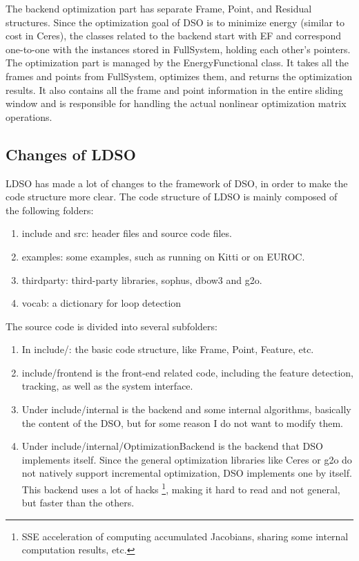 \documentclass[a4paper,10pt]{article}
\begin{document}
	The backend optimization part has separate Frame, Point, and Residual structures. Since the optimization goal of DSO is to minimize energy (similar to cost in Ceres), the classes related to the backend start with EF and correspond one-to-one with the instances stored in FullSystem, holding each other's pointers. The optimization part is managed by the EnergyFunctional class. It takes all the frames and points from FullSystem, optimizes them, and returns the optimization results. It also contains all the frame and point information in the entire sliding window and is responsible for handling the actual nonlinear optimization matrix operations.

	
	\subsection{Changes of LDSO}
	LDSO has made a lot of changes to the framework of DSO, in order to make the code structure more clear. The code structure of LDSO is mainly composed of the following folders:
	\begin{enumerate}
	\item include and src: header files and source code files.
	\item examples: some examples, such as running on Kitti or on EUROC.
	\item thirdparty: third-party libraries, sophus, dbow3 and g2o.
	\item vocab: a dictionary for loop detection
	\end{enumerate}
	The source code is divided into several subfolders:
	\begin{enumerate}
	\item In include/: the basic code structure, like Frame, Point, Feature, etc.
	\item include/frontend is the front-end related code, including the feature detection, tracking, as well as the system interface.
	\item Under include/internal is the backend and some internal algorithms, basically the content of the DSO, but for some reason I do not want to modify them.
	\item Under include/internal/OptimizationBackend is the backend that DSO implements itself. Since the general optimization libraries like Ceres or g2o do not natively support incremental optimization, DSO implements one by itself. This backend uses a lot of hacks \footnote{SSE acceleration of computing accumulated Jacobians, sharing some internal computation results, etc.}, making it hard to read and not general, but faster than the others.
	\end{enumerate}
\end{document}
